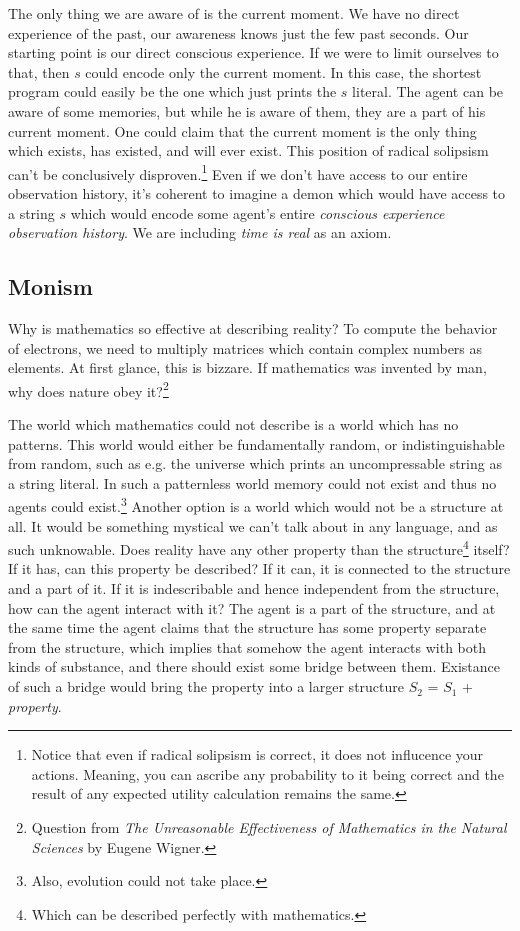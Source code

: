 The only thing we are aware of is the current moment.
We have no direct experience of the past, our awareness knows just the few past seconds.
Our starting point is our direct conscious experience.
If we were to limit ourselves to that, then $s$ could encode only the current moment.
In this case, the shortest program could easily be the one which just prints the $s$ literal.
The agent can be aware of some memories, but while he is aware of them, they are a part of his current moment.
One could claim that the current moment is the only thing which exists, has existed, and will ever exist.
This position of radical solipsism can't be conclusively disproven.\footnote{
Notice that even if radical solipsism is correct, it does not influcence your actions.
Meaning, you can ascribe any probability to it being correct and the result of any expected utility calculation remains the same.
}
Even if we don't have access to our entire observation history, it's coherent to imagine a demon which would have access to a string $s$ which would encode some agent's entire \textit{conscious experience observation history}.
We are including \textit{time is real} as an axiom.

\newpage

\subsection{Monism}

Why is mathematics so effective at describing reality?
To compute the behavior of electrons, we need to multiply matrices which contain complex numbers as elements.
At first glance, this is bizzare.
If mathematics was invented by man, why does nature obey it?\footnote{Question from \textit{The Unreasonable Effectiveness of Mathematics in the Natural Sciences} by Eugene Wigner.}

The world which mathematics could not describe is a world which has no patterns.
This world would either be fundamentally random, or indistinguishable from random, such as e.g. the universe which prints an uncompressable string as a string literal.
In such a patternless world memory could not exist and thus no agents could exist.\footnote{Also, evolution could not take place.}
Another option is a world which would not be a structure at all.
It would be something mystical we can't talk about in any language, and as such unknowable.
Does reality have any other property than the structure\footnote{Which can be described perfectly with mathematics.} itself?
If it has, can this property be described?
If it can, it is connected to the structure and a part of it.
If it is indescribable and hence independent from the structure, how can the agent interact with it?
The agent is a part of the structure, and at the same time the agent claims that the structure has some property separate from the structure, which implies that somehow the agent interacts with both kinds of substance, and there should exist some bridge between them.
Existance of such a bridge would bring the property into a larger structure $S_2$ = $S_1$ + \textit{property}.

